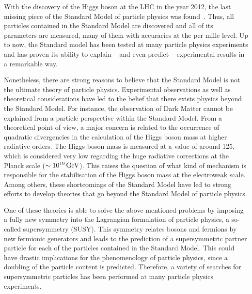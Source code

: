 \noindent With the discovery of the Higgs boson at the LHC in the year 2012, the last missing piece of the Standard Model of particle physics was found~\cite{bib:Theory:CMS:HiggsObservation,bib:Theory:Atlas:HiggsObservation}.
Thus, all particles contained in the Standard Model are discovered and all of its parameters are measured, many of them with accuracies at the per mille level.
Up to now,  the Standard model has been tested at many particle physics experiments and has proven its ability to explain -~and even predict~- experimental results in a remarkable way.

Nonetheless, there are strong reasons to believe that the Standard Model is not the ultimate theory of particle physics.
Experimental observations as well as theoretical considerations have led to the belief that there exists physics beyond the Standard Model.
For instance, the observation of Dark Matter cannot be explained from a particle perspective within the Standard Model.
From a theoretical point of view, a major concern is related to the occurrence of quadratic divergencies in the calculation of the Higgs boson mass at higher radiative orders.
The Higgs boson mass is measured at a value of around 125\gev, which is considered very low regarding the huge radiative corrections at the Planck scale ($\sim 10^{19}\,\text{Ge}\kern-0.06667em\text{V}$). 
This raises the question of what kind of mechanism is responsible for the stabilisation of the Higgs boson mass at the electroweak scale. 
Among others, these shortcomings of the Standard Model have led to strong efforts to develop theories that go beyond the Standard Model of particle physics. 

One of these theories is able to solve the above mentioned problems by imposing a fully new symmetry into the Lagrangian formulation of particle physics, a so-called supersymmetry (SUSY).
This symmetry relates bosons and fermions by new fermionic generators and leads to the prediction of a supersymmetric partner particle for each of the particles contained in the Standard Model.
This could have drastic implications for the phenomenology of particle physics, since a doubling of the particle content is predicted.
Therefore, a variety of searches for supersymmetric particles has been performed at many particle physics experiments.

